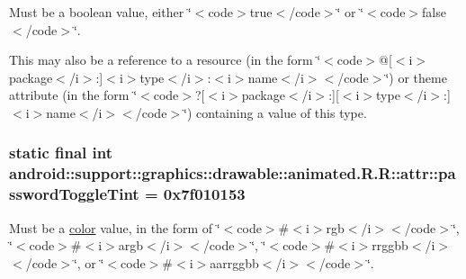 Must be a boolean value, either \char`\"{}$<$code$>$true$<$/code$>$\char`\"{} or \char`\"{}$<$code$>$false$<$/code$>$\char`\"{}. 

This may also be a reference to a resource (in the form \char`\"{}$<$code$>$@\mbox{[}$<$i$>$package$<$/i$>$:\mbox{]}$<$i$>$type$<$/i$>$:$<$i$>$name$<$/i$>$$<$/code$>$\char`\"{}) or theme attribute (in the form \char`\"{}$<$code$>$?\mbox{[}$<$i$>$package$<$/i$>$:\mbox{]}\mbox{[}$<$i$>$type$<$/i$>$:\mbox{]}$<$i$>$name$<$/i$>$$<$/code$>$\char`\"{}) containing a value of this type. \hypertarget{classandroid_1_1support_1_1graphics_1_1drawable_1_1animated_1_1_r_1_1attr_74ed8d9a12f4a9ca8615ea264f7bc765}{
\subsubsection[{passwordToggleTint}]{\setlength{\rightskip}{0pt plus 5cm}static final int android::support::graphics::drawable::animated.R.R::attr::passwordToggleTint = 0x7f010153}}
\label{classandroid_1_1support_1_1graphics_1_1drawable_1_1animated_1_1_r_1_1attr_74ed8d9a12f4a9ca8615ea264f7bc765}


Must be a \hyperlink{classandroid_1_1support_1_1graphics_1_1drawable_1_1animated_1_1_r_1_1color}{color} value, in the form of \char`\"{}$<$code$>$\#$<$i$>$rgb$<$/i$>$$<$/code$>$\char`\"{}, \char`\"{}$<$code$>$\#$<$i$>$argb$<$/i$>$$<$/code$>$\char`\"{}, \char`\"{}$<$code$>$\#$<$i$>$rrggbb$<$/i$>$$<$/code$>$\char`\"{}, or \char`\"{}$<$code$>$\#$<$i$>$aarrggbb$<$/i$>$$<$/code$>$\char`\"{}. 

